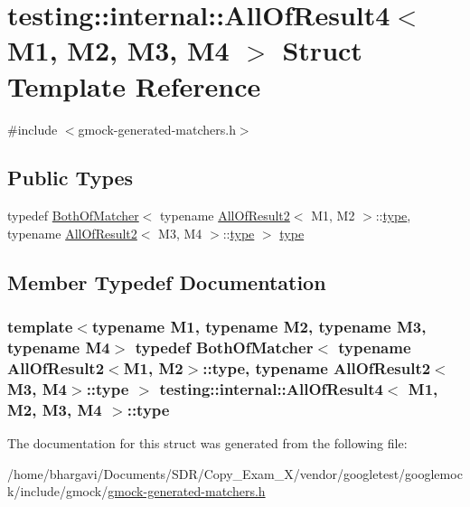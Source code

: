 \hypertarget{structtesting_1_1internal_1_1_all_of_result4}{}\section{testing\+:\+:internal\+:\+:All\+Of\+Result4$<$ M1, M2, M3, M4 $>$ Struct Template Reference}
\label{structtesting_1_1internal_1_1_all_of_result4}


{\ttfamily \#include $<$gmock-\/generated-\/matchers.\+h$>$}

\subsection*{Public Types}
\begin{DoxyCompactItemize}
\item 
typedef \hyperlink{classtesting_1_1internal_1_1_both_of_matcher}{Both\+Of\+Matcher}$<$ typename \hyperlink{structtesting_1_1internal_1_1_all_of_result2}{All\+Of\+Result2}$<$ M1, M2 $>$\+::\hyperlink{structtesting_1_1internal_1_1_all_of_result4_ab277e20178bac632d4e5a39a1a407bbf}{type}, typename \hyperlink{structtesting_1_1internal_1_1_all_of_result2}{All\+Of\+Result2}$<$ M3, M4 $>$\+::\hyperlink{structtesting_1_1internal_1_1_all_of_result4_ab277e20178bac632d4e5a39a1a407bbf}{type} $>$ \hyperlink{structtesting_1_1internal_1_1_all_of_result4_ab277e20178bac632d4e5a39a1a407bbf}{type}
\end{DoxyCompactItemize}


\subsection{Member Typedef Documentation}
\subsubsection[{\texorpdfstring{type}{type}}]{\setlength{\rightskip}{0pt plus 5cm}template$<$typename M1, typename M2, typename M3, typename M4$>$ typedef {\bf Both\+Of\+Matcher}$<$ typename {\bf All\+Of\+Result2}$<$M1, M2$>$\+::{\bf type}, typename {\bf All\+Of\+Result2}$<$M3, M4$>$\+::{\bf type} $>$ {\bf testing\+::internal\+::\+All\+Of\+Result4}$<$ M1, M2, M3, M4 $>$\+::{\bf type}}\hypertarget{structtesting_1_1internal_1_1_all_of_result4_ab277e20178bac632d4e5a39a1a407bbf}{}\label{structtesting_1_1internal_1_1_all_of_result4_ab277e20178bac632d4e5a39a1a407bbf}


The documentation for this struct was generated from the following file\+:\begin{DoxyCompactItemize}
\item 
/home/bhargavi/\+Documents/\+S\+D\+R/\+Copy\+\_\+\+Exam\+\_\+X/vendor/googletest/googlemock/include/gmock/\hyperlink{gmock-generated-matchers_8h}{gmock-\/generated-\/matchers.\+h}\end{DoxyCompactItemize}
